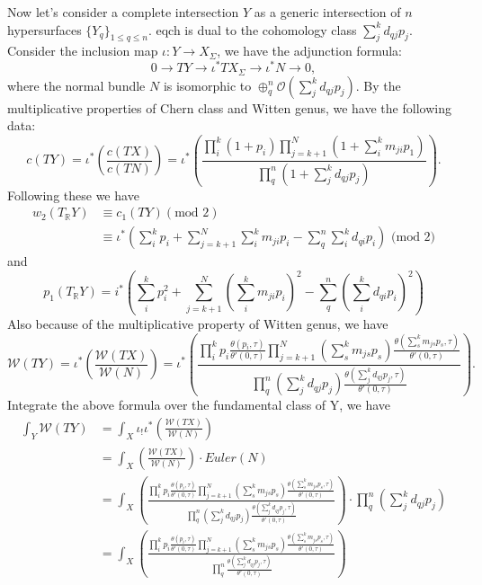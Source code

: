 \documentclass[11pt]{article}
\begin{document}
Now let's consider a complete intersection $Y$ as a generic intersection of $n$ hypersurfaces $\{Y_q\}_{1\leq q\leq n}$. eqch is dual to the cohomology class $\sum_{j}^k d_{q j} p_j$.
Consider the inclusion map $\iota: Y\rightarrow X_\Sigma$, we have the adjunction formula:
$$
0\longrightarrow TY\longrightarrow\iota^*TX_{\Sigma}\longrightarrow\iota^*N\longrightarrow0,
$$
where the normal bundle $N$ is isomorphic to $\oplus_q^n\mathcal{O}(\sum_{j}^k d_{q j} p_j)$.
By the multiplicative properties of Chern class and Witten genus, we have the following data:
$$
c(TY)=\iota^*\left(\frac{c(TX)}{c(TN)}\right)=\iota^*\left(\frac{\prod_i^k (1+p_i)\prod_{j=k+1}^{N}(1+\sum_i^k m_{ji}p_1)}{\prod_{q}^n(1+\sum_{j}^k d_{q j} p_j)}\right).
$$
Following these we have
$$
\begin{aligned}
w_2(T_\mathbb{R}Y)& \equiv c_1(TY) (\text{mod } 2)\\
& \equiv \iota^*\left(\sum_i^k p_i+\sum_{j=k+1}^{N} \sum_i^k m_{ji}p_i-\sum_{q}^n\sum_i^k d_{qi}p_i\right) \text{     (mod } 2)
\end{aligned}
$$
and 
$$
p_1(T_{\mathbb{R}}Y)=i^*\left(\sum_i^k p_i^2+\sum_{j=k+1}^N (\sum_i^k m_{ji}p_i)^2-\sum_q^n(\sum_i^k d_{qi}p_i)^2\right)
$$
Also because of the multiplicative property of Witten genus, we have
$$
\mathcal{W}(TY)=\iota^*\left(\frac{\mathcal{W}(TX)}{\mathcal{W}(N)}\right)=\iota^*\left(\frac{\prod_i^k p_i \frac{\theta(p_i,\tau)}{\theta'(0,\tau)}\prod_{j=k+1}^N (\sum_s^k m_{js}p_s) \frac{\theta(\sum_s^k m_{js}p_s,\tau)}{\theta'(0,\tau)}}{\prod_{q}^n(\sum_j^k d_{q j} p_j) \frac{\theta(\sum_j^k d_{q j} p_j,\tau)}{\theta'(0,\tau)}}\right).
$$
Integrate the above formula over the fundamental class of Y, we have
$$
\begin{aligned}
\int_{Y} \mathcal{W}(TY) 
& =\int_X \iota_!\iota^*\left(\frac{\mathcal{W}(TX)}{\mathcal{W}(N)}\right)\\
& =\int_X \left(\frac{\mathcal{W}(TX)}{\mathcal{W}(N)}\right)\cdot Euler(N)\\
& =\int_X \left(\frac{\prod_i^k p_i \frac{\theta(p_i,\tau)}{\theta'(0,\tau)}\prod_{j=k+1}^N (\sum_s^k m_{js}p_s) \frac{\theta(\sum_s^k m_{js}p_s,\tau)}{\theta'(0,\tau)}}{\prod_{q}^n(\sum_j^k d_{q j} p_j) \frac{\theta(\sum_j^k d_{q j} p_j,\tau)}{\theta'(0,\tau)}}\right)\cdot \prod_{q}^n(\sum_j^k d_{q j} p_j)\\
& =\int_X \left(\frac{\prod_i^k p_i \frac{\theta(p_i,\tau)}{\theta'(0,\tau)}\prod_{j=k+1}^N (\sum_s^k m_{js}p_s) \frac{\theta(\sum_s^k m_{js}p_s,\tau)}{\theta'(0,\tau)}}{\prod_{q}^n \frac{\theta(\sum_j^k d_{q j} p_j,\tau)}{\theta'(0,\tau)}}\right)
\end{aligned}
$$
\end{document}
